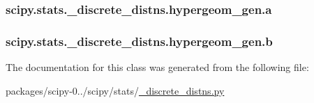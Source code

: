 \subsubsection[{a}]{\setlength{\rightskip}{0pt plus 5cm}scipy.\+stats.\+\_\+discrete\+\_\+distns.\+hypergeom\+\_\+gen.\+a}\label{classscipy_1_1stats_1_1__discrete__distns_1_1hypergeom__gen_a16af028db64b391cc5f2780784969302}
\hypertarget{classscipy_1_1stats_1_1__discrete__distns_1_1hypergeom__gen_ae934b0cc16615b3111465f16eb6fc2ba}{}
\subsubsection[{b}]{\setlength{\rightskip}{0pt plus 5cm}scipy.\+stats.\+\_\+discrete\+\_\+distns.\+hypergeom\+\_\+gen.\+b}\label{classscipy_1_1stats_1_1__discrete__distns_1_1hypergeom__gen_ae934b0cc16615b3111465f16eb6fc2ba}


The documentation for this class was generated from the following file\+:\begin{DoxyCompactItemize}
\item 
packages/scipy-\/0../scipy/stats/\hyperlink{__discrete__distns_8py}{\+\_\+discrete\+\_\+distns.\+py}\end{DoxyCompactItemize}
